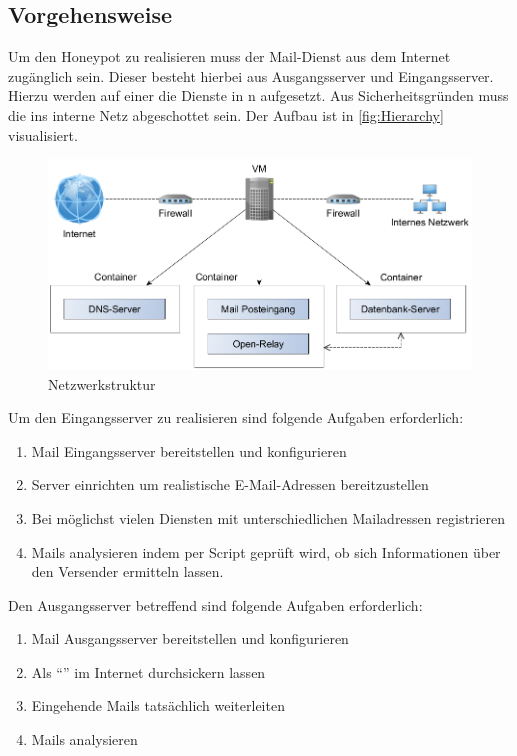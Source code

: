 \documentclass[a4paper,11pt,singlespacing]{article}
\begin{document}
	\subsection{Vorgehensweise}\label{sec:EinleitungVorgehensweise}
		Um den Honeypot zu realisieren muss der Mail-Dienst aus dem Internet zugänglich sein.
		Dieser besteht hierbei aus Ausgangsserver und Eingangsserver.
		Hierzu werden auf einer  die Dienste in n aufgesetzt.
		Aus Sicherheitsgründen muss die  ins interne Netz abgeschottet sein.
		Der Aufbau ist in \autoref{fig:Hierarchy} visualisiert.

		\begin{figure}[H]
			\includegraphics[width=\linewidth]{2-Hierarchy.png}
			\caption{Netzwerkstruktur}
			\label{fig:Hierarchy}
		\end{figure}

		Um den Eingangsserver zu realisieren sind folgende Aufgaben erforderlich:
		\begin{enumerate}
			\item Mail Eingangsserver bereitstellen und konfigurieren
			\item {} Server einrichten um realistische E-Mail-Adressen bereitzustellen
			\item Bei möglichst vielen Diensten mit unterschiedlichen Mailadressen registrieren
			\item Mails analysieren indem per Script geprüft wird, ob sich Informationen  über den Versender ermitteln lassen.
		\end{enumerate}

		Den Ausgangsserver betreffend sind folgende Aufgaben erforderlich:
		\begin{enumerate}
			\item Mail Ausgangsserver bereitstellen und konfigurieren
			\item Als "`"' im Internet durchsickern lassen
			\item Eingehende Mails tatsächlich weiterleiten
			\item Mails analysieren
		\end{enumerate}
\end{document}
